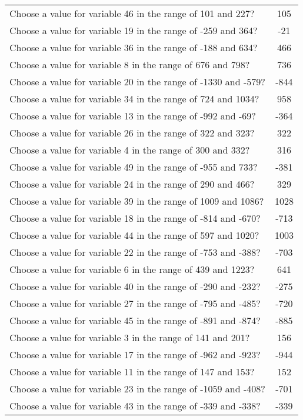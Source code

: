 \documentclass[10pt,a4paper]{article}
\begin{document}
\begin{appendix}
\begin{tabular}{ l  c }
\\Choose a value for variable 46 in the range of 101 and 227? & 105
\\Choose a value for variable 19 in the range of -259 and 364? & -21
\\Choose a value for variable 36 in the range of -188 and 634? & 466
\\Choose a value for variable 8 in the range of 676 and 798? & 736
\\Choose a value for variable 20 in the range of -1330 and -579? & -844
\\Choose a value for variable 34 in the range of 724 and 1034? & 958
\\Choose a value for variable 13 in the range of -992 and -69? & -364
\\Choose a value for variable 26 in the range of 322 and 323? & 322
\\Choose a value for variable 4 in the range of 300 and 332? & 316
\\Choose a value for variable 49 in the range of -955 and 733? & -381
\\Choose a value for variable 24 in the range of 290 and 466? & 329
\\Choose a value for variable 39 in the range of 1009 and 1086? & 1028
\\Choose a value for variable 18 in the range of -814 and -670? & -713
\\Choose a value for variable 44 in the range of 597 and 1020? & 1003
\\Choose a value for variable 22 in the range of -753 and -388? & -703
\\Choose a value for variable 6 in the range of 439 and 1223? & 641
\\Choose a value for variable 40 in the range of -290 and -232? & -275
\\Choose a value for variable 27 in the range of -795 and -485? & -720
\\Choose a value for variable 45 in the range of -891 and -874? & -885
\\Choose a value for variable 3 in the range of 141 and 201? & 156
\\Choose a value for variable 17 in the range of -962 and -923? & -944
\\Choose a value for variable 11 in the range of 147 and 153? & 152
\\Choose a value for variable 23 in the range of -1059 and -408? & -701
\\Choose a value for variable 43 in the range of -339 and -338? & -339

\end{tabular}
\end{appendix}
\end{document}
